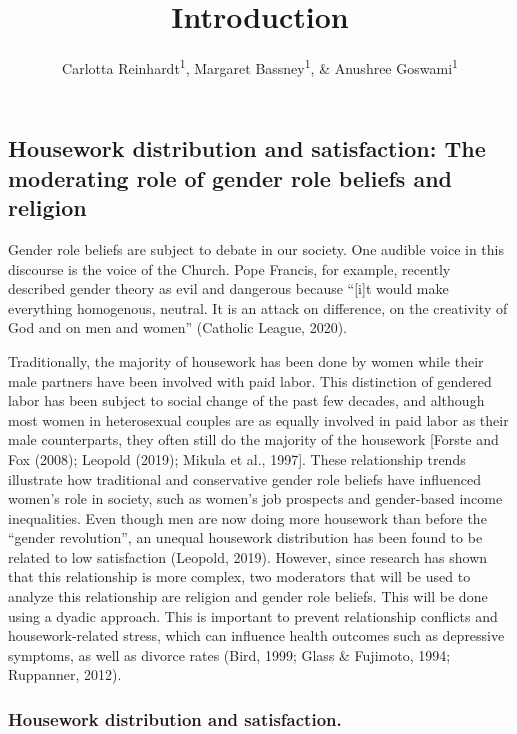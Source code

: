 \documentclass[
  english,
  man]{apa6}
\title{Introduction}
\author{Carlotta Reinhardt\textsuperscript{1}, Margaret Bassney\textsuperscript{1}, \& Anushree Goswami\textsuperscript{1}}
\date{}
\affiliation{\vspace{0.5cm}\textsuperscript{1} Smith College}
\begin{document}
\maketitle

\hypertarget{housework-distribution-and-satisfaction-the-moderating-role-of-gender-role-beliefs-and-religion}{%
\subsection{Housework distribution and satisfaction: The moderating role of gender role beliefs and religion}\label{housework-distribution-and-satisfaction-the-moderating-role-of-gender-role-beliefs-and-religion}}

Gender role beliefs are subject to debate in our society. One audible voice in this discourse is the voice of the Church. Pope Francis, for example, recently described gender theory as evil and dangerous because \enquote{{[}i{]}t would make everything homogenous, neutral. It is an attack on difference, on the creativity of God and on men and women} (Catholic League, 2020).

Traditionally, the majority of housework has been done by women while their male partners have been involved with paid labor. This distinction of gendered labor has been subject to social change of the past few decades, and although most women in heterosexual couples are as equally involved in paid labor as their male counterparts, they often still do the majority of the housework {[}Forste and Fox (2008); Leopold (2019); Mikula et al., 1997{]}. These relationship trends illustrate how traditional and conservative gender role beliefs have influenced women's role in society, such as women's job prospects and gender-based income inequalities. Even though men are now doing more housework than before the \enquote{gender revolution}, an unequal housework distribution has been found to be related to low satisfaction (Leopold, 2019). However, since research has shown that this relationship is more complex, two moderators that will be used to analyze this relationship are religion and gender role beliefs. This will be done using a dyadic approach. This is important to prevent relationship conflicts and housework-related stress, which can influence health outcomes such as depressive symptoms, as well as divorce rates (Bird, 1999; Glass \& Fujimoto, 1994; Ruppanner, 2012).

\hypertarget{housework-distribution-and-satisfaction.}{%
\subsubsection{Housework distribution and satisfaction.}\label{housework-distribution-and-satisfaction.}}
\end{document}
